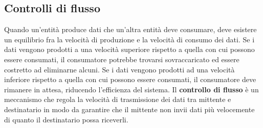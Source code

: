 \documentclass[12pt]{report}
\begin{document}
	\subsection{Controlli di flusso}
	Quando un'entità produce dati che un'altra entità deve consumare, deve esistere un equilibrio fra la velocità di produzione e la velocità di consumo dei dati. Se i dati vengono prodotti a una velocità superiore rispetto a quella con cui possono essere consumati, il consumatore potrebbe trovarsi sovraccaricato ed essere costretto ad eliminarne alcuni. Se i dati vengono prodotti ad una velocità inferiore rispetto a quella con cui possono essere consumati, il consumatore deve rimanere in attesa, riducendo l'efficienza del sistema. Il \textbf{controllo di flusso} è un meccanismo che regola la velocità di trasmissione dei dati tra mittente e destinatario in modo da garantire che il mittente non invii dati più velocemente di quanto il destinatario possa riceverli. 
\end{document}
